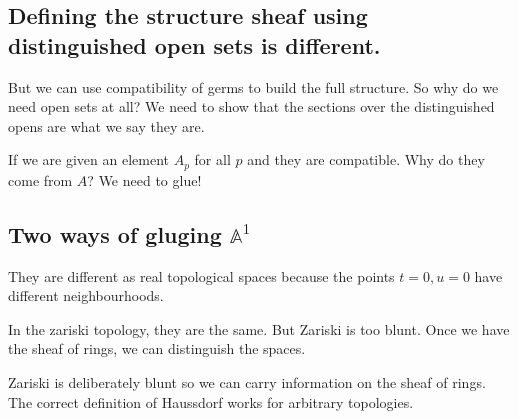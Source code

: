 \documentclass{book}
\newcommand{\A}{\ensuremath{\mathbb{A}}}
\theoremstyle{definition}
\begin{document}
\subsection{Defining the structure sheaf using distinguished open sets is different.}
But we can use compatibility of germs to build the full structure. So why
do we need open sets at all? We need to show that the sections over the
distinguished opens are what we say they are.

If we are given an element $A_p$ for all $p$ and they are compatible.
Why do they come from $A$? We need to glue!

\subsection{Two ways of gluging $\A^1$}
They are different as real topological spaces because the points $t = 0, u = 0$
have different neighbourhoods.

In the zariski topology, they are the same. But Zariski is too blunt. Once
we have the sheaf of rings, we can distinguish the spaces.

Zariski is deliberately blunt so we can carry information on the sheaf of
rings.
The correct definition of Haussdorf works for arbitrary topologies.
\end{document}
